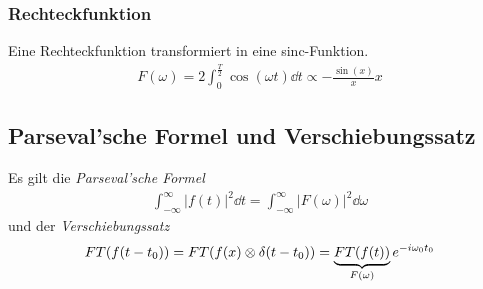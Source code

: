 
\subsubsection{Rechteckfunktion} Eine Rechteckfunktion transformiert in
eine sinc-Funktion.
\begin{gather*}
  F(\omega) 
  = 2\int_{0}^{\frac{T}{2}}\cos(\omega t)\dd t
  \propto -\frac{\sin(x)}{x} x
\end{gather*}




\subsection{Parseval'sche Formel und Verschiebungssatz}
Es gilt die \emph{Parseval'sche Formel}
\begin{gather*}
  \int_{-\infty}^{\infty} |f(t)|^2 \dd t 
  = \int_{-\infty}^{\infty} |F(\omega)|^2 \dd\omega
\end{gather*}
und der \emph{Verschiebungssatz}
\begin{align*}
  FT(f(t-t_0)) = FT(f(x)\otimes\delta(t-t_0))
  = \underbrace{FT(f(t))}_{F(\omega)}e^{-i\omega_0 t_0}
\end{align*}


